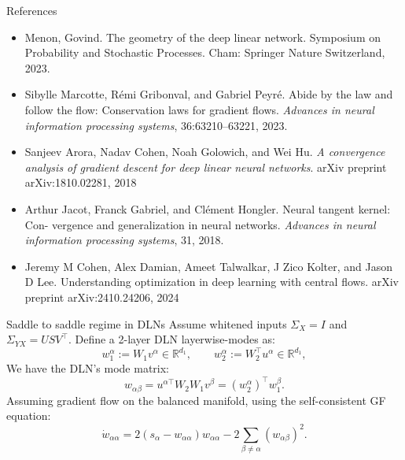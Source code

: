 \documentclass[aspectratio=169,11pt]{beamer}
\begin{document}
\begin{frame}{References}
    \begin{itemize}
        \item Menon, Govind. The geometry of the deep linear network. Symposium on Probability and Stochastic Processes. Cham: Springer Nature Switzerland, 2023.
        \item Sibylle Marcotte, R\'emi Gribonval, and Gabriel Peyr\'e. Abide by the law and
follow the flow: Conservation laws for gradient flows. \textit{Advances in neural
information processing systems}, 36:63210–63221, 2023.
    \item Sanjeev Arora, Nadav Cohen, Noah Golowich, and Wei Hu. \textit{A convergence
analysis of gradient descent for deep linear neural networks}. arXiv preprint
arXiv:1810.02281, 2018
    \item Arthur Jacot, Franck Gabriel, and Cl\'ement Hongler. Neural tangent kernel: Con-
    vergence and generalization in neural networks. \textit{Advances in neural information
    processing systems}, 31, 2018.
    \item Jeremy M Cohen, Alex Damian, Ameet Talwalkar, J Zico Kolter, and Jason D
    Lee. Understanding optimization in deep learning with central flows. arXiv
    preprint arXiv:2410.24206, 2024
    \end{itemize}
\end{frame}
\begin{frame}{Saddle to saddle regime in DLNs}
Assume whitened inputs $\Sigma_X = I$ and $\Sigma_{YX} = U S V^{\top}$. Define a 2-layer DLN layerwise-modes as:
\begin{equation*}
    w_1^{\alpha} := W_1 v^{\alpha} \in \mathbb{R}^{d_1}, 
    \qquad
    w_2^{\alpha} := W_2^{\top} u^{\alpha} \in \mathbb{R}^{d_1},
\end{equation*}
We have the DLN's mode matrix:
\begin{equation*}
    w_{\alpha\beta}=u^{\alpha\top} W_2 W_1 v^{\beta} = (w_2^{\alpha})^{\top} w_1^{\beta}.
\end{equation*}
Assuming gradient flow on the balanced manifold, using the self-consistent GF equation:
\begin{equation*}
    \dot{w}_{\alpha\alpha} = 2\left(s_{\alpha} - w_{\alpha\alpha}\right)w_{\alpha\alpha}
    - 2\sum_{\beta\neq\alpha} \left(w_{\alpha\beta}\right)^2 .
\end{equation*}
\end{frame}
\end{document}
